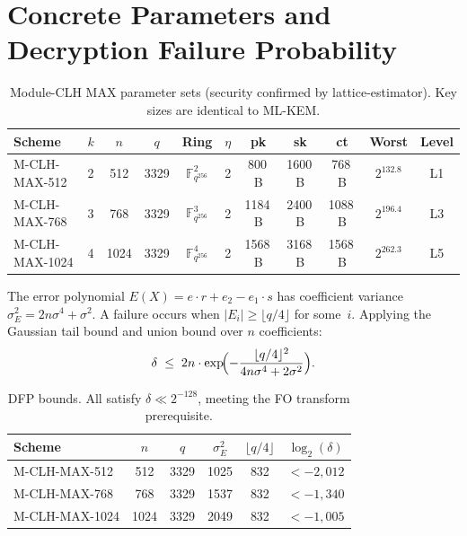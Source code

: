 \documentclass[11pt,a4paper]{article}
\theoremstyle{remark}
\begin{document}
\section{Concrete Parameters and Decryption Failure Probability}
\label{sec:dfp}

\begin{table}[h]
\centering\small
\setlength{\tabcolsep}{5pt}
\begin{tabular}{lcccccccccc}
\toprule
\textbf{Scheme} & $k$ & $n$ & $q$ & \textbf{Ring} & $\eta$
  & \textbf{pk} & \textbf{sk} & \textbf{ct} & \textbf{Worst} & \textbf{Level}\\
\midrule
M-CLH-MAX-512
  & 2 & 512 & 3329 & $\mathbb{F}_{q^{256}}^{2}$ & 2
  & 800\,B & 1600\,B & 768\,B & $2^{132.8}$ & L1\\
M-CLH-MAX-768
  & 3 & 768 & 3329 & $\mathbb{F}_{q^{256}}^{3}$ & 2
  & 1184\,B & 2400\,B & 1088\,B & $2^{196.4}$ & L3\\
M-CLH-MAX-1024
  & 4 & 1024 & 3329 & $\mathbb{F}_{q^{256}}^{4}$ & 2
  & 1568\,B & 3168\,B & 1568\,B & $2^{262.3}$ & L5\\
\bottomrule
\end{tabular}
\caption{Module-CLH MAX parameter sets (security confirmed by lattice-estimator).
  Key sizes are identical to ML-KEM.}
\label{tab:params}
\end{table}

The error polynomial $E(X)=e\cdot r+e_{2}-e_{1}\cdot s$ has coefficient
variance $\sigma^{2}_{E}=2n\sigma^{4}+\sigma^{2}$.
A failure occurs when $|E_{i}|\ge\lfloor q/4\rfloor$ for some~$i$.
Applying the Gaussian tail bound and union bound over $n$ coefficients:
\[
\delta \;\le\; 2n\cdot\exp\!\Bigl(-\frac{\lfloor q/4\rfloor^{2}}
                               {4n\sigma^{4}+2\sigma^{2}}\Bigr).
\]

\begin{table}[h]
\centering\small
\begin{tabular}{lccccc}
\toprule
\textbf{Scheme} & $n$ & $q$ & $\sigma^{2}_{E}$ & $\lfloor q/4\rfloor$
  & $\log_{2}(\delta)$\\
\midrule
M-CLH-MAX-512  & 512  & 3329 & 1025 & 832 & $<-2{,}012$\\
M-CLH-MAX-768  & 768  & 3329 & 1537 & 832 & $<-1{,}340$\\
M-CLH-MAX-1024 & 1024 & 3329 & 2049 & 832 & $<-1{,}005$\\
\bottomrule
\end{tabular}
\caption{DFP bounds. All satisfy $\delta\ll 2^{-128}$,
  meeting the FO transform prerequisite.}
\label{tab:dfp}
\end{table}
\end{document}
